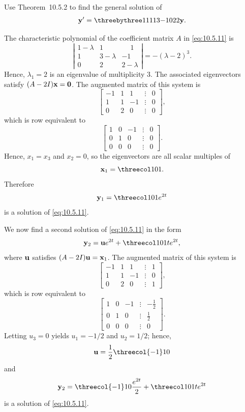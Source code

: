 \setcounter{example}{3}
\setcounter{equation}{10}
\begin{example}
  \label{example:10.5.4}\rm Use Theorem~10.5.2 to find the general solution of
  \begin{equation}
    \label{eq:10.5.11}{\bf y}'=\threebythree11113{-1}022{\bf y}.
  \end{equation}
\end{example}
\begin{examplesolution}
\solution The characteristic polynomial of the coefficient matrix $A$ in \eqref{eq:10.5.11} is
\[
  \left|
  \begin{array}{ccc}
    1-\lambda & 1         & \phantom{-}1 \\
    1         & 3-\lambda & -1           \\
    0         & 2         & 2-\lambda
  \end{array}\right|=-(\lambda-2)^{3}.
\]
Hence, $\lambda_{1}=2$ is an eigenvalue of multiplicity $3$. The associated eigenvectors satisfy
$(A-2I){\bf x}={\bf0}$. The augmented matrix of this system is
\[
  \left[
  \begin{array}{rrrcr}
    -1 & 1 & 1  & \vdots & 0 \\
    1  & 1 & -1 & \vdots & 0 \\
    0  & 2 & 0  & \vdots & 0
  \end{array}\right],
\]
which is row equivalent to
\[
  \left[
  \begin{array}{rrrcr}
    1 & 0 & -1 & \vdots & 0 \\
    0 & 1 & 0  & \vdots & 0 \\
    0 & 0 & 0  & \vdots & 0
  \end{array}\right].
\]
Hence, $x_{1}=x_{3}$ and $x_{2}=0$, so the eigenvectors are all scalar multiples of
\[
  {\bf x}_{1}=\threecol101.
\]
Therefore
\[
  {\bf y}_{1}=\threecol101e^{2t}
\]
is a solution of \eqref{eq:10.5.11}.

We now find a second solution of \eqref{eq:10.5.11} in the form
\[
  {\bf y}_{2}={\bf u}e^{2t}+\threecol101te^{2t},
\]
where ${\bf u}$ satisfies $(A-2I){\bf u}={\bf x}_{1}$. The augmented matrix of this system is
\[
  \left[
  \begin{array}{rrrcr}
    -1 & 1 & 1  & \vdots & 1 \\
    1  & 1 & -1 & \vdots & 0 \\
    0  & 2 & 0  & \vdots & 1
  \end{array}\right],
\]
which is row equivalent to
\[
  \left[
  \begin{array}{rrrcr}
    1 & 0 & -1 & \vdots & -\frac{1}{2} \\
    0 & 1 & 0  & \vdots & \frac{1}{2}  \\
    0 & 0 & 0  & \vdots & 0
  \end{array}\right].
\]
Letting $u_{3}=0$ yields $u_{1}=-1/2$ and $u_{2}=1/2$; hence,
\[
  {\bf u}=\frac{1}{2}\threecol{-1}10
\]
and
\[
  {\bf y}_{2}=\threecol{-1}10{\frac{e^{2t}}{2}}+\threecol101te^{2t}
\]
is a solution of \eqref{eq:10.5.11}.


\end{examplesolution}
